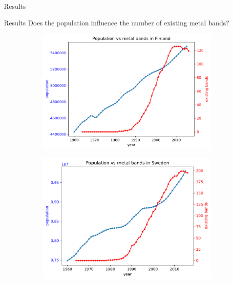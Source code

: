 \documentclass{beamer}
\begin{document}
\begin{frame}{Results}
\begin{figure}
\begin{subfigure}[b]{0.65\textwidth}
		\end{subfigure}
	\end{figure}
\end{frame}

\begin{frame}{Results}
	Does the population influence the number of existing metal bands?
	
	\begin{figure}
		\begin{subfigure}[b]{0.315\textwidth}
			\includegraphics[width=\textwidth]{Population-Bands/populationVsBandFinland}
		\end{subfigure}
		\begin{subfigure}[b]{0.3\textwidth}
			\includegraphics[width=\textwidth]{Population-Bands/populationVsBandSweden}
		\end{subfigure}

\end{figure}
\end{frame}
\end{document}
